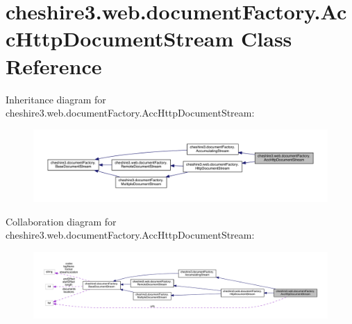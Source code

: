 \hypertarget{classcheshire3_1_1web_1_1document_factory_1_1_acc_http_document_stream}{\section{cheshire3.\-web.\-document\-Factory.\-Acc\-Http\-Document\-Stream Class Reference}
\label{classcheshire3_1_1web_1_1document_factory_1_1_acc_http_document_stream}
}


Inheritance diagram for cheshire3.\-web.\-document\-Factory.\-Acc\-Http\-Document\-Stream\-:
\nopagebreak
\begin{figure}[H]
\begin{center}
\leavevmode
\includegraphics[width=350pt]{classcheshire3_1_1web_1_1document_factory_1_1_acc_http_document_stream__inherit__graph}
\end{center}
\end{figure}


Collaboration diagram for cheshire3.\-web.\-document\-Factory.\-Acc\-Http\-Document\-Stream\-:
\nopagebreak
\begin{figure}[H]
\begin{center}
\leavevmode
\includegraphics[width=350pt]{classcheshire3_1_1web_1_1document_factory_1_1_acc_http_document_stream__coll__graph}
\end{center}
\end{figure}
